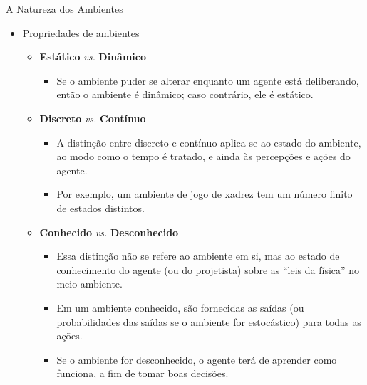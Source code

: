 \documentclass{libs/ufc_format}
\begin{document}
\begin{frame}{A Natureza dos Ambientes}
    \begin{itemize}
        \item Propriedades de ambientes
            \begin{itemize}
                \item \textbf{Estático} \textit{vs.} \textbf{Dinâmico}
                    \begin{itemize}
                        \justifying
                        \item<1> Se o ambiente puder se alterar enquanto um agente está deliberando, então o ambiente é dinâmico; caso contrário, ele é estático.
                    \end{itemize}
                \item<2-> \textbf{Discreto} \textit{vs.} \textbf{Contínuo}
                    \begin{itemize}
                        \justifying
                        \item<2> A distinção entre discreto e contínuo aplica-se ao estado do ambiente, ao modo como o tempo é tratado, e ainda às percepções e ações do agente.
                        \item<2> Por exemplo, um ambiente de jogo de xadrez tem um número finito de estados distintos.
                    \end{itemize}
                \item<3> \textbf{Conhecido} \textit{vs.} \textbf{Desconhecido}
                    \begin{itemize}
                        \justifying
                        \item<3> Essa distinção não se refere ao ambiente em si, mas ao estado de conhecimento do agente (ou do projetista) sobre as ``leis da física'' no meio ambiente.
                        \item<3> Em um ambiente conhecido, são fornecidas as saídas (ou probabilidades das saídas se o ambiente for estocástico) para todas as ações.
                        \item<3> Se o ambiente for desconhecido, o agente terá de aprender como funciona, a fim de tomar boas decisões.
                    \end{itemize}
            \end{itemize}
    \end{itemize}
\end{frame}

\end{document}
